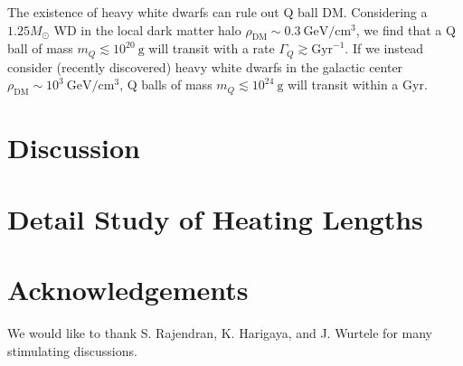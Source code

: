 \documentclass[twocolumn,showpacs,preprintnumbers,amsmath,amssymb,prl]{revtex4}
\begin{document}
The existence of heavy white dwarfs can rule out Q ball DM. Considering a $1.25 M_{\odot}$ WD in the local dark matter halo $\rho_{\text{DM}} \sim 0.3 ~\text{GeV}/\text{cm}^3$, we find that a Q ball of mass $m_Q \lesssim 10^{20} ~\text{g}$ will transit with a rate $\Gamma_Q \gtrsim \text{Gyr}^{-1}$. If we instead consider (recently discovered) heavy white dwarfs in the galactic center $\rho_{\text{DM}} \sim 10^3 ~\text{GeV}/\text{cm}^3$, Q balls of mass $m_Q \lesssim 10^{24} ~\text{g}$ will transit within a Gyr.

\section{Discussion}

\appendix

\section{Detail Study of Heating Lengths}
\label{app:heatinglengthfull}

\section{Acknowledgements}
We would like to thank S. Rajendran, K. Harigaya, and J. Wurtele for many stimulating discussions. 


\end{document}
